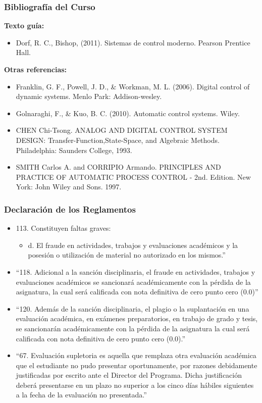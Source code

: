 \documentclass[aspectratio=169,handout]{beamer}
\theoremstyle{definition}
\theoremstyle{plain}
\theoremstyle{remark}
\begin{document}
\begin{frame}[c]\frametitle{Bibliografía del Curso}
\small
\textbf{Texto guía:}
\begin{itemize}
  \item Dorf, R. C., Bishop, (2011). Sistemas de control moderno. Pearson Prentice Hall.
\end{itemize}
\textbf{Otras referencias:}
\begin{itemize}
  \item Franklin, G. F., Powell, J. D., \& Workman, M. L. (2006). Digital control of dynamic systems. Menlo Park: Addison-wesley.
  \item Golnaraghi, F., \& Kuo, B. C. (2010). Automatic control systems. Wiley.
  \item CHEN Chi-Tsong. ANALOG AND DIGITAL CONTROL SYSTEM DESIGN: Transfer-Function,State-Space, and Algebraic Methods. Philadelphia: Saunders College, 1993.
  \item SMITH Carlos A. and CORRIPIO Armando. PRINCIPLES AND PRACTICE OF AUTOMATIC PROCESS CONTROL - 2nd. Edition. New York: John Wiley and Sons. 1997.
\end{itemize}
\end{frame}

\begin{frame}[<+->][c]\frametitle{Declaración de los Reglamentos}
\footnotesize
\begin{itemize}
  \item 113. Constituyen faltas graves:
  \begin{itemize}
    \footnotesize
    \item d. El fraude en actividades, trabajos y evaluaciones académicos y la posesión o utilización de material no autorizado en los mismos.”
  \end{itemize}
  \item “118. Adicional a la sanción disciplinaria, el fraude en actividades, trabajos y evaluaciones académicos se sancionará académicamente con la pérdida de la asignatura, la cual será calificada con nota definitiva de cero punto cero (0.0)”
  \item “120. Además de la sanción disciplinaria, el plagio o la suplantación en una evaluación académica, en exámenes preparatorios, en trabajo de grado y tesis, se sancionarán académicamente con la pérdida de la asignatura la cual será calificada con nota definitiva de cero punto cero (0.0).”
  \item “67. Evaluación supletoria es aquella que remplaza otra evaluación académica que el estudiante no pudo presentar oportunamente, por razones debidamente justificadas por escrito ante el Director del Programa. Dicha justificación deberá presentarse en un plazo no superior a los cinco días hábiles siguientes a la fecha de la evaluación no presentada.”
\end{itemize}
\end{frame}
\end{document}
